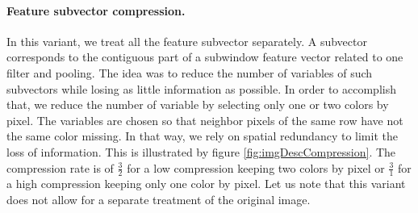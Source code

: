 \documentclass[a4paper]{report}
\begin{document}
		\paragraph{Feature subvector compression.}
		In this variant, we treat all the feature subvector separately. A subvector corresponds to the contiguous part of a subwindow feature vector related to one filter and pooling. The idea was to reduce the number of variables of such subvectors while losing as little information as possible. In order to accomplish that, we reduce the number of variable by selecting only one or two colors by pixel. The variables are chosen so that neighbor pixels of the same row have not the same color missing. In that way, we rely on spatial redundancy to limit the loss of information. This is illustrated by figure \ref{fig:imgDescCompression}. The compression rate is of $\frac{3}{2}$ for a low compression keeping two colors by pixel or $\frac{3}{1}$ for a high compression keeping only one color by pixel.
		Let us note that this variant does not allow for a separate treatment of the original image.
		
\end{document}

